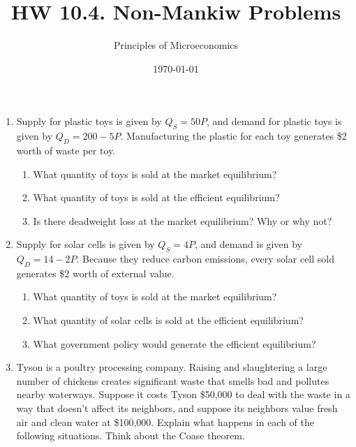 \documentclass{article}
\title{HW 10.4. Non-Mankiw Problems}
\author{Principles of Microeconomics}
\date{\today}
\begin{document}
\maketitle

\begin{enumerate}

\item Supply for plastic toys is given by $Q_S = 50P$, and demand for plastic toys is given by $Q_D = 200 - 5P$. Manufacturing the plastic for each toy generates \$2 worth of waste per toy. 

	\begin{enumerate}
	
	\item What quantity of toys is sold at the market equilibrium? 
	
	\item What quantity of toys is sold at the efficient equilibrium? 
	
	\item Is there deadweight loss at the market equilibrium? Why or why not? 
	
	\end{enumerate}

\item Supply for solar cells is given by $Q_S = 4P$, and demand is given by $Q_D = 14 - 2P$. Because they reduce carbon emissions, every solar cell sold generates \$2 worth of external value.

	\begin{enumerate}
	
	\item What quantity of toys is sold at the market equilibrium?
	
	\item What  quantity of solar cells is sold at the efficient equilibrium? 
	
	\item What government policy would generate the efficient equilibrium?
	
	\end{enumerate}
	
\item Tyson is a poultry processing company. Raising and slaughtering a large number of chickens creates significant waste that smells bad and pollutes nearby waterways. Suppose it costs Tyson \$50,000 to deal with the waste in a way that doesn’t affect its neighbors, and suppose its neighbors value fresh air and clean water at \$100,000. Explain what happens in each of the following situations. Think about the Coase theorem.


\end{enumerate}
\end{document}
